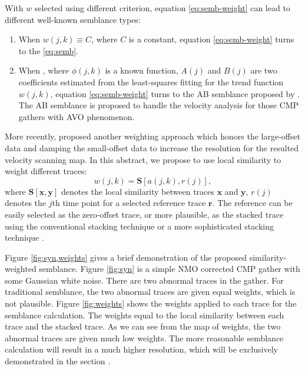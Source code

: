 With $w$ selected using different criterion, equation \ref{eq:semb-weight} can lead to different well-known semblance types:
\begin{enumerate}
\item When $w(j,k)\equiv C$, where $C$ is a constant, equation \ref{eq:semb-weight} turns to the  \ref{eq:semb}. 
\item When , where $\phi(j,k)$ is a known function, $A(j)$ and $B(j)$ are two coefficients estimated from the least-squares fitting for the trend function $w(j,k)$, equation \ref{eq:semb-weight} turns to the AB semblance proposed by \cite{fomel20091}. The AB semblance is proposed to handle the velocity analysis for those CMP gathers with AVO phenomenon. 
\end{enumerate}
More recently, \cite{luosimon2012} proposed another weighting approach which honors the large-offset data and damping the small-offset data to increase the resolution for the resulted velocity scanning map.
In this abstract, we propose to use local similarity \cite[]{fomel2007localattr} to weight different traces:
\begin{equation}
\label{eq:simiweight}
w(j,k)=\mathcal{\mathbf{S}}[a(j,k),r(j)],
\end{equation}
where $\mathcal{\mathbf{S}}[\mathbf{x},\mathbf{y}]$ denotes the local similarity between traces $\mathbf{x}$ and $\mathbf{y}$, $r(j)$ denotes the $j$th time point for a selected reference trace $\mathbf{r}$. The reference can be easily selected as the zero-offset trace, or more plausible, as the stacked trace using the conventional stacking technique or a more sophisticated stacking technique \cite[]{guochang2009}. 

Figure \ref{fig:syn,weights} gives a brief demonstration of the proposed similarity-weighted semblance. Figure \ref{fig:syn} is a simple NMO corrected CMP gather with some Gaussian white noise. There are two abnormal traces in the gather. For traditional semblance, the two abnormal traces are given equal weights, which is not plausible. Figure \ref{fig:weights} shows the weights applied to each trace for the semblance calculation. The weights equal to the local similarity between each trace and the stacked trace.
As we can see from the map of weights, the two abnormal traces are given much low weights. The more reasonable semblance calculation will result in a much higher resolution, which will be exclusively demonstrated in the section . 

